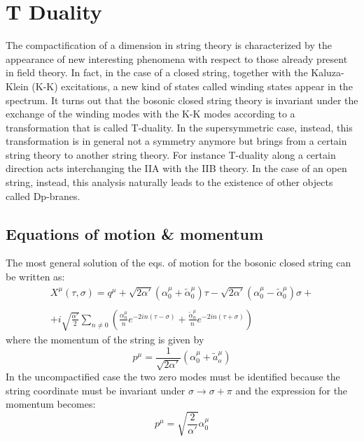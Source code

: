 \section{T Duality}
The compactification of a dimension in string theory is characterized by the appearance of new interesting phenomena with respect to those already present in field theory. In fact, in the case of a closed string, together with the Kaluza-Klein (K-K) excitations, a new kind of states called winding states appear in the spectrum. It turns out that the bosonic closed string
theory is invariant under the exchange of the winding modes with the K-K modes according to a transformation that is called T-duality. In the supersymmetric case, instead, this transformation is in general not a symmetry anymore but brings from a certain string theory to another string theory. For instance T-duality along a certain direction acts interchanging the IIA with the IIB theory. In the case of an open string, instead, this analysis
naturally leads to the existence of other objects called Dp-branes.
\subsection{Equations of motion \& momentum}
The most general solution of the eqs. of motion for the bosonic closed string can be written as:
\begin{multline}
	X^\mu\left(\tau,\sigma\right) = q^\mu + \sqrt{2\alpha'}\left(\alpha_0^\mu + \tilde{\alpha}_0^\mu\right)\tau - \sqrt{2\alpha'}\left(\alpha_0^\mu - \tilde{\alpha}_0^\mu\right)\sigma +\\ \\
	+i\sqrt{\frac{\alpha'}{2}}\sum_{n\neq 0}{\left(\frac{\alpha_n^\mu}{n}e^{-2in\left(\tau-\sigma\right)} + \frac{\tilde{\alpha}_n^\mu}{n}e^{-2in\left(\tau+\sigma\right)}\right)}
\end{multline}
where the momentum of the string is given by 
\begin{equation}
	p^\mu = \frac{1}{\sqrt{2\alpha'}}\left(\alpha_0^\mu+\tilde{a}_o^\mu\right)
\end{equation}
In the uncompactified case the two zero modes must be identified because the string coordinate must be invariant under $\sigma \rightarrow \sigma+\pi$ and the expression for the momentum becomes:
\begin{equation}
	p^\mu = \sqrt{\frac{2}{\alpha'}}\alpha_0^\mu
	\label{T1}
\end{equation}
